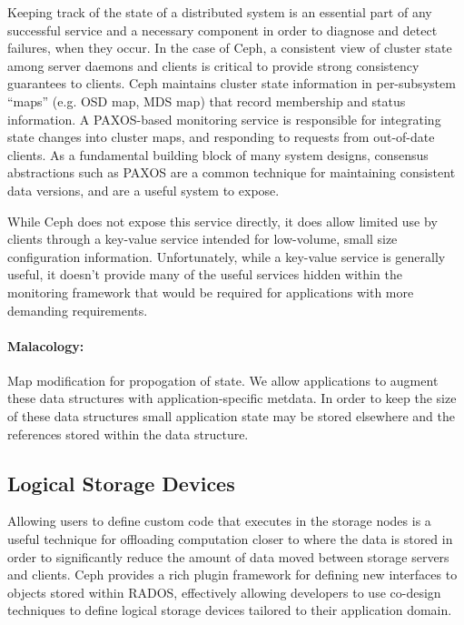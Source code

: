 \documentclass[10pt,twocolumn]{article}
\begin{document}
Keeping track of the state of a distributed system is an essential part of any 
successful service and a necessary component in order to diagnose and detect 
failures, when they occur. In the case of Ceph, a consistent view of cluster 
state among server daemons and clients is critical
to provide strong consistency guarantees to clients. Ceph maintains cluster
state information in per-subsystem ``maps'' (e.g. OSD map, MDS map) that
record membership and status information. A PAXOS-based monitoring service is
responsible for integrating state changes into cluster maps, and responding to
requests from out-of-date clients. As a fundamental building block of many
system designs, consensus abstractions such as PAXOS are a common technique
for maintaining consistent data versions, and are a useful system to expose.

While Ceph does not expose this service directly, it does allow limited use by
clients through a key-value service intended for low-volume, small size
configuration information. Unfortunately, while a key-value service is
generally useful, it doesn't provide many of the useful services hidden within
the monitoring framework that would be required for applications with more
demanding requirements.

\paragraph*{Malacology:} Map modification for propogation of state. We allow applications to augment
these data structures with application-specific metdata. In order to keep the
size of these data structures small application state may be stored elsewhere
and the references stored within the data structure.


\subsection{Logical Storage Devices}
\label{active-storage}

Allowing users to define custom code that executes in the storage nodes is a 
useful technique for offloading computation closer to where the data is stored 
in order to significantly reduce the amount of data moved between storage 
servers and clients. Ceph provides a rich plugin framework for defining new 
interfaces to objects
stored within RADOS, effectively allowing developers to use co-design
techniques to define logical storage devices tailored to their application
domain.
\end{document}
